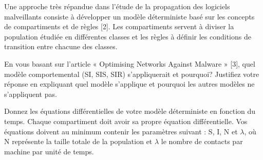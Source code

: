 


\begin{homeworkProblem}
Une approche très répandue dans l’étude de la propagation des logiciels malveillants
consiste à développer un modèle déterministe basé sur les concepts de compartiments et
de règles [2]. Les compartiments servent à diviser la population étudiée en différentes
classes et les règles à définir les conditions de transition entre chacune des classes.
\begin{homeworkSection}{1.1}
En vous basant sur l’article « Optimising Networks Against Malware » [3], quel
modèle comportemental (SI, SIS, SIR) s’appliquerait et pourquoi? Justifiez votre réponse
en expliquant quel modèle s’applique et pourquoi les autres modèles ne s’appliquent pas.

\end{homeworkSection}
\begin{homeworkSection}{1.2}
Donnez les équations différentielles de votre modèle déterministe en fonction du temps. 
Chaque compartiment doit avoir sa propre équation différentielle.
Vos équations doivent au minimum contenir les paramètres suivant : S, I, N et $\lambda$, où N représente la taille totale de la population et $\lambda$ le nombre de contacts par machine par unité de temps.


\end{homeworkSection}
\end{homeworkProblem}

